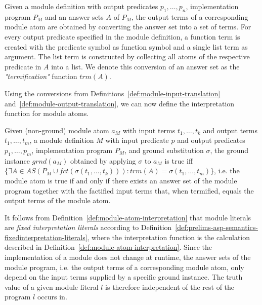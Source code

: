
\begin{definition}
\label{def:module-output-translation}
Given a module definition with output predicates $p_1,\ldots,p_n$, implementation program $P_M$ and an  answer sets $A$ of $P_M$, the output terms of a corresponding module atom are obtained by converting the answer set into a set of terms. For every output predicate specified in the module definition, a function term is created with the predicate symbol as function symbol and a single list term as argument. The list term is constructed by collecting all atoms of the respective predicate in $A$ into a list.
We denote this conversion of an answer set as the \emph{"termification"} function $\mathit{trm(A)}$.
\end{definition}

Using the conversions from Definitions~\ref{def:module-input-translation} and~\ref{def:module-output-translation}, we can now define the interpretation function for module atoms.

\begin{definition}
\label{def:module-atom-interpretation}
Given (non-ground) module atom $a_M$ with input terms $t_1,\ldots,t_k$ and output terms $t_1,\ldots,t_m$, a module definition $M$ with input predicate $p$ and output predicates $p_1,\ldots,p_m$, implementation program $P_M$, and ground substitution $\sigma$, the ground instance $grnd(a_M)$ obtained by applying $\sigma$ to $a_M$ is true iff $\{\exists A \in AS(P_M \cup fct(\sigma(t_1,\ldots,t_k))): trm(A) = \sigma(t_{1},\ldots,t_m) \}$, i.e. the module atom is true if and only if there exists an answer set of the module program together with the factified input terms that, when termified, equals the output terms of the module atom.
\end{definition}	

\begin{corollary}
\label{cor:fixed-module-interpretation}
It follows from Definition~\ref{def:module-atom-interpretation} that module literals are \emph{fixed interpretation literals} according to Definition~\ref{def:prelims-asp-semantics-fixedinterpretation-literals}, where the interpretation function is the calculation described in Definition~\ref{def:module-atom-interpretation}. Since the implementation of a module does not change at runtime, the answer sets of the module program, i.e. the output terms of a corresponding module atom, only depend on the input terms supplied by a specific ground instance. The truth value of a given module literal $l$ is therefore independent of the rest of the program $l$ occurs in.
\end{corollary}

